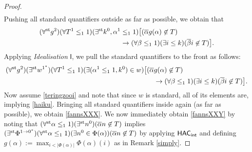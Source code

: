 \documentclass[reqno]{amsart}
\newcommand\be{\begin{equation}}
\newcommand\ee{\end{equation}}
\def\STP{\textup{\textsf{STP}}}
\def\P{\textup{\textsf{P}}}
\def\st{\textup{st}}
\def\di{\rightarrow}
\def\QFAC{\textup{\textsf{QF-AC}}}
\def\HAC{\textup{\textsf{HAC}}}
\def\INT{\textup{\textsf{int}}}
\numberwithin{equation}{section}
\numberwithin{thm}{section}
\begin{document}
\begin{proof}
\begin{align}
\end{align}
Pushing all standard quantifiers outside as far as possible, we obtain that
\begin{align}
(\forall^{\st}g^{2})(\forall T^{1}\leq_{1}1)(\exists^{\st}k^{0}, \alpha^{1}&\leq_{1}1)\big[(\overline{\alpha}g(\alpha)\not\in T)\label{haiku}\\
&\di(\forall \beta\leq_{1}1)(\exists i\leq k)(\overline{\beta}i\not\in T) \big].\notag
\end{align}
Applying \emph{Idealisation} $\textsf{I}$, we pull the standard quantifiers to the front as follows:
\begin{align}\label{teringzooi}
(\forall^{\st}g^{2})(\exists^{\st}w^{1^{*}})(\forall T^{1}\leq_{1}1)(\exists ( \alpha^{1}\leq_{1}1,  k^{0}) \in w)\big[(\overline{\alpha}&g(\alpha)\not\in T)\\
&\di(\forall \beta\leq_{1}1)(\exists i\leq k)(\overline{\beta}i\not\in T) \big]. \notag
\end{align}
Now assume \eqref{teringzooi} and note that since $w$ is standard, all of its elements are, implying \eqref{haiku}.  
Bringing all standard quantifiers inside again (as far as possible), we obtain \eqref{fannsXXX}.  We now immediately obtain \eqref{fannsXXY} by noting that 
$(\forall^{\st}\alpha\leq_{1}1)(\exists^{\st}n^{0})(\overline{\alpha}n\not\in T)$ implies $(\exists^{\st}\Phi^{1\di 0^{*}})(\forall^{\st}\alpha\leq_{1}1)(\exists n^{0}\in \Phi(\alpha))(\overline{\alpha}n\not\in T)$ by applying $\HAC_{\INT}$ and defining $g(\alpha):=\max_{i<|\Phi(\alpha)|}\Phi(\alpha)(i)$ as in Remark \ref{simply}.   

\end{proof}
\end{document}
